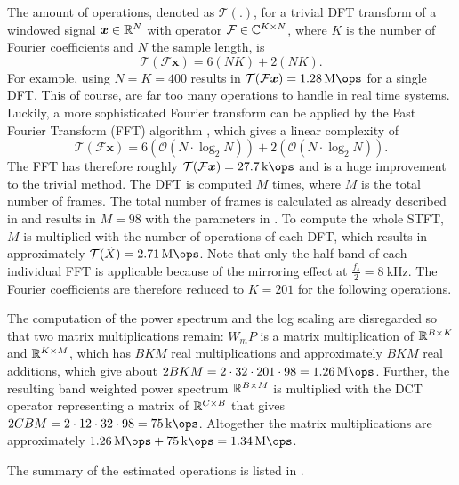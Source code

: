 The amount of operations, denoted as $\mathcal{T(.)}$, for a trivial DFT transform of a windowed signal $\bm{x} \in \mathbb{R}^N$ with operator $\mathcal{F} \in \mathbb{C}^{K \times N}$, where $K$ is the number of Fourier coefficients and $N$ the sample length, is
\begin{equation}
  \mathcal{T}(\mathcal{F} \bm{x}) = 6 (N K) + 2 (N K).
\end{equation}
For example, using $N = K = 400$ results in $\mathcal{T}(\mathcal{F} \bm{x}) = \SI{1.28}{\mega\ops}$ for a single DFT.
This of course, are far too many operations to handle in real time systems.
Luckily, a more sophisticated Fourier transform can be applied by the Fast Fourier Transform (FFT) algorithm \cite{Brigham1967}, which gives a linear complexity of
\begin{equation}
  \mathcal{T}(\mathcal{F} \bm{x}) = 6 (\mathcal{O}(N \cdot \log_2 N)) + 2 (\mathcal{O}(N \cdot \log_2 N)).
\end{equation}
The FFT has therefore roughly $\mathcal{T}(\mathcal{F} \bm{x}) = \SI{27.7}{\kilo\ops}$ and is a huge improvement to the trivial method.
The DFT is computed $M$ times, where $M$ is the total number of frames.
The total number of frames is calculated as already described in  and results in $M = 98$ with the parameters in .
To compute the whole STFT, $M$ is multiplied with the number of operations of each DFT, which results in approximately $\mathcal{T}(\tilde{X}) = \SI{2.71}{\mega\ops}$.
Note that only the half-band of each individual FFT is applicable because of the mirroring effect at $\frac{f_s}{2} = \SI{8}{\kilo\hertz}$.
The Fourier coefficients are therefore reduced to $K = 201$ for the following operations.

The computation of the power spectrum and the log scaling are disregarded so that two matrix multiplications remain:
$W_m P$ is a matrix multiplication of $\mathbb{R}^{B \times K}$ and $\mathbb{R}^{K \times M}$, which has $B K M$ real multiplications and approximately $B K M$ real additions, which give about $2 B K M = 2 \cdot 32 \cdot 201 \cdot 98 =  \SI{1.26}{\mega\ops}$.
Further, the resulting band weighted power spectrum $\mathbb{R}^{B \times M}$ is multiplied with the DCT operator representing a matrix of $\mathbb{R}^{C \times B}$ that gives $2 C B M = 2 \cdot 12 \cdot 32 \cdot 98 = \SI{75}{\kilo\ops}$.
Altogether the matrix multiplications are approximately $\SI{1.26}{\mega\ops} + \SI{75}{\kilo\ops} = \SI{1.34}{\mega\ops}$.

The summary of the estimated operations is listed in .




